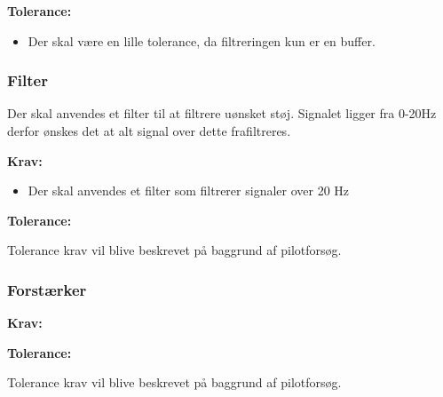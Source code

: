 \textbf{Tolerance:}
\begin{itemize}
Tolerance krav vil blive beskrevet på baggrund af pilotforsøg.
\item Der skal være en lille tolerance, da filtreringen kun er en buffer. 
\end{itemize}

\subsubsection{Filter}
Der skal anvendes et filter til at filtrere uønsket støj. Signalet ligger fra 0-20Hz derfor ønskes det at alt signal over dette frafiltreres. 

\textbf{Krav:}
\begin{itemize}
\item Der skal anvendes et filter som filtrerer signaler over 20 Hz
\end{itemize}

\textbf{Tolerance:}
\begin{itemize}
Tolerance krav vil blive beskrevet på baggrund af pilotforsøg.
\end{itemize}

\subsubsection{Forstærker}
\textbf{Krav:}
\begin{itemize}

\end{itemize}

\textbf{Tolerance:}
\begin{itemize}
Tolerance krav vil blive beskrevet på baggrund af pilotforsøg.
\end{itemize}




